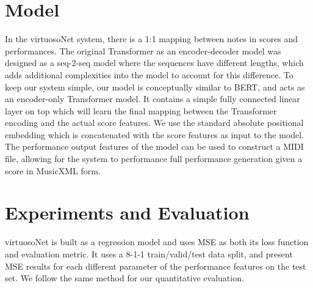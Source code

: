 \section{Model}
In the virtuosoNet system, there is a 1:1 mapping between notes in scores and performances. The original Transformer as an encoder-decoder model was designed as a seq-2-seq model where the sequences have different lengths, which adds additional complexities into the model to account for this difference. To keep our system simple, our model is conceptually similar to BERT, and acts as an encoder-only Transformer model.  It contains a simple fully connected linear layer on top which will learn the final mapping between the Transformer encoding and the actual score features. We use the standard absolute positional embedding which is concatenated with the score features as input to the model. The performance output features of the model can be used to construct a MIDI file, allowing for the system to performance full performance generation given a score in MusicXML form. 

\section{Experiments and Evaluation}
virtuosoNet is built as a regression model and uses MSE as both its loss function and evaluation metric. It uses a 8-1-1 train/valid/test data split, and \citet{jeong2019virtuosonet} present MSE results for each different parameter of the performance features on the test set. We follow the same method for our quantitative evaluation. 



    

